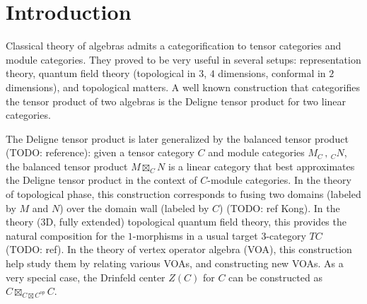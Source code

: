 


%
%
%


\section{Introduction}

Classical theory of algebras admits a categorification to tensor categories
and module categories. They proved to be very useful in several setups:
representation theory, quantum field theory (topological in $3$, $4$
dimensions, conformal in $2$ dimensions), and topological matters. A well
known construction that categorifies the tensor product of two algebras is the
Deligne tensor product for two linear categories.

The Deligne tensor product is later generalized by the balanced tensor product
(TODO: reference): given a tensor category $C$ and module categories
$M_{C} \,,\, {}_{C}N$, the balanced tensor product $M \boxtimes_{C} N$ is a
linear category that best approximates the Deligne tensor product in the
context of $C$-module categories. In the theory of topological phase, this
construction corresponds to fusing two domains (labeled by $M$ and $N$) over
the domain wall (labeled by $C$) (TODO: ref Kong). In the theory ($3$D, fully
extended) topological quantum field theory, this provides the natural
composition for the $1$-morphisms in a usual target $3$-category $TC$ (TODO:
ref). In the theory of vertex operator algebra (VOA), this construction help
study them by relating various VOAs, and constructing new VOAs. As a very
special case, the Drinfeld center $Z(C)$ for $C$ can be constructed as
$C \boxtimes_{C \boxtimes C^{op}} C$.

